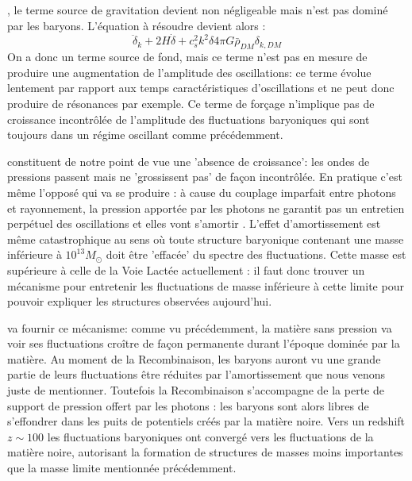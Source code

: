 , le terme source de gravitation devient non négligeable mais n'est pas dominé par les baryons. L'équation à résoudre devient alors :
\begin{equation}
\ddot \delta_k+2H\dot \delta +c_s^2k^2 \delta 4\pi G \bar\rho_{DM} \delta_{k,DM}
\end{equation}
On a donc un terme source de fond, mais ce terme n'est pas en mesure de produire une augmentation de l'amplitude des oscillations: ce terme évolue lentement par rapport aux temps caractéristiques d'oscillations et ne peut donc produire de résonances par exemple. Ce terme de forçage n'implique pas de croissance incontrôlée de l'amplitude des fluctuations baryoniques qui sont toujours dans un régime oscillant comme précédemment.

 constituent de notre point de vue une 'absence de croissance': les ondes de pressions passent mais ne 'grossissent pas' de façon incontrôlée. En pratique c'est même l'opposé qui va se produire : à cause du couplage imparfait entre photons et rayonnement, la pression apportée par les photons ne garantit pas un entretien perpétuel des oscillations et elles vont s'amortir . L'effet d'amortissement est même catastrophique au sens où toute structure baryonique contenant une masse inférieure à $10^{13} M_\odot$  doit être 'effacée' du spectre des fluctuations. Cette masse est supérieure à celle de la Voie Lactée actuellement : il faut donc trouver un mécanisme pour entretenir les fluctuations de masse inférieure à cette limite pour pouvoir expliquer les structures observées aujourd'hui.

 va fournir ce mécanisme: comme vu précédemment, la matière sans pression va voir ses fluctuations croître de façon permanente durant l'époque dominée par la matière. Au moment de la Recombinaison, les baryons auront vu une grande partie de leurs fluctuations être réduites par l'amortissement que nous venons juste de mentionner. Toutefois la Recombinaison s'accompagne de la perte de support de pression offert par les photons : les baryons sont alors libres de s'effondrer dans les puits de potentiels créés par la matière noire. Vers un redshift $z\sim 100$ les fluctuations baryoniques ont convergé vers les fluctuations de la matière noire, autorisant la formation de structures de masses moins importantes que la masse limite mentionnée précédemment.

